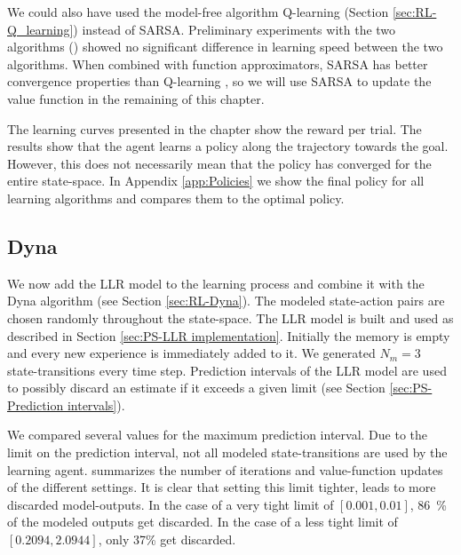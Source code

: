 We could also have used the model-free algorithm Q-learning (Section \ref{sec:RL-Q_learning}) instead of SARSA. Preliminary experiments with the two algorithms () showed no significant difference in learning speed between the two algorithms. When combined with function approximators, SARSA has better convergence properties than Q-learning \cite{Gordon:95}, so we will use SARSA to update the value function in the remaining of this chapter.

The learning curves presented in the chapter show the reward per trial. The results show that the agent learns a policy along the trajectory towards the goal. However, this does not necessarily mean that the policy has converged for the entire state-space. In Appendix \ref{app:Policies} we show the final policy for all learning algorithms and compares them to the optimal policy.

\subsection{Dyna} \label{sec:PS-Dyna}
We now add the \ac{LLR} model to the learning process and combine it with the Dyna algorithm (see Section \ref{sec:RL-Dyna}). The modeled state-action pairs are chosen randomly throughout the state-space. The \ac{LLR} model is built and used as described in Section \ref{sec:PS-LLR implementation}. Initially the memory is empty and every new experience is immediately added to it. We generated $N_m = 3$ state-transitions every time step. Prediction intervals of the \ac{LLR} model are used to possibly discard an estimate if it exceeds a given limit (see Section \ref{sec:PS-Prediction intervals}).

We compared several values for the maximum prediction interval. Due to the limit on the prediction interval, not all modeled state-transitions are used by the learning agent.  summarizes the number of iterations and value-function updates of the different settings. It is clear that setting this limit tighter, leads to more discarded model-outputs. In the case of a very tight limit of $[0.001,0.01]$, 86~\% of the modeled outputs get discarded. In the case of a less tight limit of $[0.2094,2.0944]$, only 37\% get discarded. 

